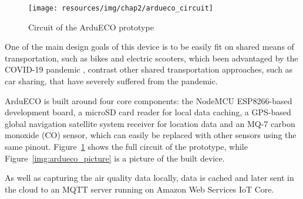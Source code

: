 			\begin{figure}[h]
				\centering
				\texttt{[image: resources/img/chap2/ardueco\_circuit]}
				\caption{Circuit of the ArduECO prototype}
				\label{img:ardueco_circuit}
			\end{figure}
			
			One of the main design goals of this device is to be easily fit on shared means of transportation, such as bikes and electric scooters, which been advantaged by the COVID-19 pandemic \cite{HU2021102997}, contrast other shared transportation approaches, such as car sharing, that have severely suffered from the pandemic.
			
			ArduECO is built around four core components: the NodeMCU ESP8266-based development board, a microSD card reader for local data caching, a GPS-based global navigation satellite system receiver for location data and an MQ-7 carbon monoxide (CO) sensor, which can easily be replaced with other sensors using the same pinout.
			Figure~\ref{img:ardueco_circuit} shows the full circuit of the prototype, while Figure~\ref{img:ardueco_picture} is a picture of the built device.
			
			As well as capturing the air quality data locally, data is cached and later sent in the cloud to an MQTT server running on Amazon Web Services IoT Core.
			
